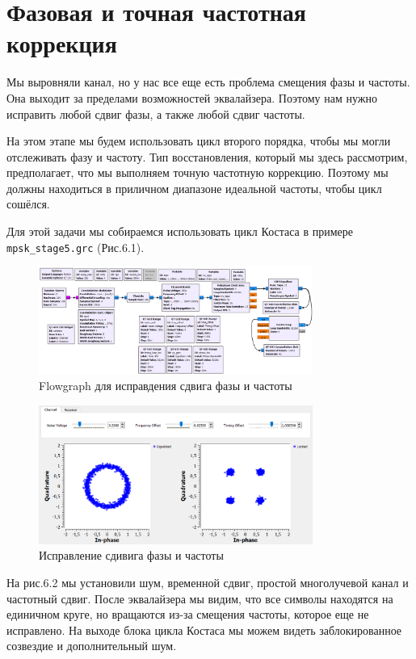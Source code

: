 \documentclass[a4paper,12pt]{report}
\begin{document}
\chapter{Фазовая и точная частотная коррекция}
    Мы выровняли канал, но у нас все еще есть проблема смещения фазы и частоты. Она выходит за пределами возможностей эквалайзера. Поэтому нам нужно исправить любой сдвиг фазы, а также любой сдвиг частоты.
    
    На этом этапе мы будем использовать цикл второго порядка, чтобы мы могли отслеживать фазу и частоту. Тип восстановления, который мы здесь рассмотрим, предполагает, что мы выполняем точную частотную коррекцию. Поэтому мы должны находиться в приличном диапазоне идеальной частоты, чтобы цикл сошёлся.
    
    Для этой задачи мы собираемся использовать цикл Костаса в примере \texttt{mpsk\_stage5.grc} (Рис.6.1).
\begin{figure}[H]
        \centering
        \includegraphics[width=0.8\textwidth]{fig6-1.PNG}
        \caption{Flowgraph для исправдения сдвига фазы и частоты}
        \label{fig:fig6-1}
\end{figure}
\begin{figure}[H]
        \centering
        \includegraphics[width=0.8\textwidth]{fig6-2.PNG}
        \caption{Исправление сдивига фазы и частоты}
        \label{fig:fig6-2}
\end{figure}  

    На рис.6.2 мы установили шум, временной сдвиг, простой многолучевой канал и частотный сдвиг. После эквалайзера мы видим, что все символы находятся на единичном круге, но вращаются из-за смещения частоты, которое еще не исправлено. На выходе блока цикла Костаса мы можем видеть заблокированное созвездие и дополнительный шум.
\end{document}
